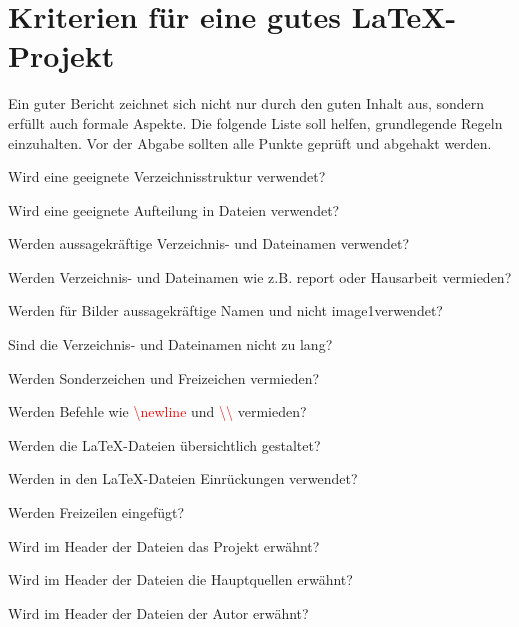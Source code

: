 %
%




\chapter{Kriterien für eine gutes \LaTeX-Projekt}


Ein guter Bericht zeichnet sich nicht nur durch den guten Inhalt aus, sondern erfüllt auch formale Aspekte. Die folgende Liste soll helfen, grundlegende Regeln einzuhalten. Vor der Abgabe sollten alle Punkte geprüft und abgehakt werden.


  \begin{todolist}
    \item Wird eine geeignete Verzeichnisstruktur verwendet?
    \item Wird eine geeignete Aufteilung in Dateien verwendet?
    \item Werden aussagekräftige Verzeichnis- und Dateinamen verwendet?
      \begin{todolist}
          \item Werden Verzeichnis- und Dateinamen wie z.B. report oder Hausarbeit vermieden?
          \item Werden für Bilder aussagekräftige Namen und nicht \glqq image1\grqq verwendet?
          \item Sind die Verzeichnis- und Dateinamen nicht zu lang?
          \item Werden Sonderzeichen und Freizeichen vermieden?
      \end{todolist}
    \item Werden Befehle wie \textcolor{red}{\textbackslash newline} und \textcolor{red}{\textbackslash\textbackslash}{} vermieden?
    \item Werden die \LaTeX-Dateien übersichtlich gestaltet?
      \begin{todolist}
          \item Werden in den \LaTeX-Dateien Einrückungen verwendet?
          \item Werden Freizeilen eingefügt?
          \item Wird im Header der Dateien das Projekt erwähnt?
          \item Wird im Header der Dateien  die Hauptquellen erwähnt?
          \item Wird im Header der Dateien  der Autor erwähnt?
      \end{todolist}

\end{todolist}
